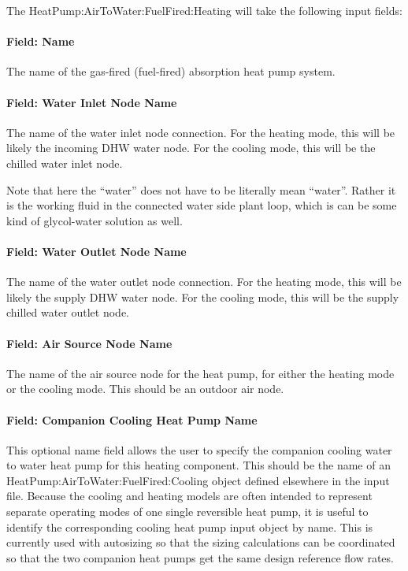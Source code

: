 The HeatPump:AirToWater:FuelFired:Heating will take the following input fields:

\paragraph{Field: Name}
The name of the gas-fired (fuel-fired) absorption heat pump system.

\paragraph{Field: Water Inlet Node Name}

The name of the water inlet node connection. For the heating mode, this will be likely the incoming DHW water node. For the cooling mode, this will be the chilled water inlet node.

Note that here the ``water'' does not have to be literally mean ``water''. Rather it is the working fluid in the connected water side plant loop, which is can be some kind of glycol-water solution as well. 

\paragraph{Field: Water Outlet Node Name}
The name of the water outlet node connection. For the heating mode, this will be likely the supply DHW water node. For the cooling mode, this will be the supply chilled water outlet node.

\paragraph{Field: Air Source Node Name}
The name of the air source node for the heat pump, for either the heating mode or the cooling mode. This should be an outdoor air node.

\paragraph{Field: Companion Cooling Heat Pump Name}

This optional name field allows the user to specify the companion cooling water to water heat pump for this heating component. This should be the name of an HeatPump:AirToWater:FuelFired:Cooling object defined elsewhere in the input file. Because the cooling and heating models are often intended to represent separate operating modes of one single reversible heat pump, it is useful to identify the corresponding cooling heat pump input object by name. This is currently used with autosizing so that the sizing calculations can be coordinated so that the two companion heat pumps get the same design reference flow rates.

